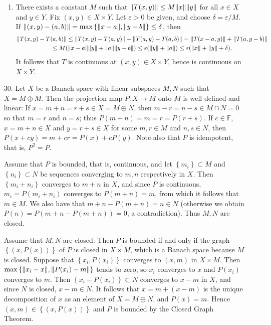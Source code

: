 \documentclass[11pt,leqno]{article}
\theoremstyle{plain}
\theoremstyle{definition}
\numberwithin{equation}{section}
\numberwithin{lem}{section}
\newcommand{\cbr}[1]{\left\{#1\right\}}
\begin{document}
\begin{enumerate}
\begin{enumerate}
    \item There exists a constant $M$ such that $\norm{T(x,y)}\leq M\norm{x}\norm{y}$ for all $x\in X$ and $y\in Y$. Fix $(x,y)\in X\times Y$. Let $\varepsilon>0$ be given, and choose $\delta = \varepsilon/M$. If $\norm{(x,y) - (a,b)} = \max\cbr{\norm{x-a},\norm{y-b}}\leq\delta$, then \begin{multline*}
      \norm{T(x,y) - T(a,b)} \leq \norm{T(x,y) - T(a,y)} + \norm{T(a,y) - T(a,b)} = \norm{T(x-a,y)} + \norm{T(a,y-b)}\\ \leq M(\norm{x-a}\norm{y} + \norm{a}\norm{y-b})\leq \varepsilon(\norm{y} + \norm{a})\leq \varepsilon(\norm{x} + \norm{y} + \delta).
    \end{multline*}
    It follows that $T$ is continuous at $(x,y)\in X\times Y$, hence is continuous on $X\times Y$.
  \end{enumerate}
  
  \item[30.] Let $X$ be a Banach space with linear subspaces $M,N$ such that $X = M\oplus M$. Then the projection map $P\colon X \to M$ onto $M$ is well defined and linear: If $x= m+n= r+s\in X = M\oplus N$, then $m-r = n-s \in M\cap N = 0$ so that $m = r$ and $n = s$; thus $P(m+n) = m = r = P(r+s)$. If $c\in\mathbb F$, $x = m+n\in X$ and $y = r+s\in X$ for some $m,r\in M$ and $n,s\in N$, then $P(x+cy)= m+cr = P(x) + cP(y)$. Note also that $P$ is idempotent, that is, $P^2 = P$.

  Assume that $P$ is bounded, that is, continuous, and let $\cbr{m_i}\subset M$ and $\cbr{n_i}\subset N$ be sequences converging to $m,n$ respectively in $X$. Then $\cbr{m_i + n_i}$ converges to $m+n$ in $X$, and since $P$ is continuous, $m_i = P(m_i+n_i)$ converges to $P(m+n) = m$, from which it follows that $m\in M$. We also have that $m+n-P(m+n) = n\in N$ (otherwise we obtain $P(n) = P(m+n-P(m+n)) = 0$, a contradiction). Thus $M,N$ are closed.

  Assume that $M,N$ are closed. Then $P$ is bounded if and only if the graph $\cbr{(x,P(x))}$ of $P$ is closed in $X\times M$, which is a Banach space because $M$ is closed. Suppose that $\cbr{x_i,P(x_i)}$ converges to $(x,m)$ in $X\times M$. Then $\max\cbr{\norm{x_i-x}, \norm{P(x_i)-m}}$ tends to zero, so $x_i$ converges to $x$ and $P(x_i)$ converges to $m$. Then $\cbr{x_i-P(x_i)}\subset N$ converges to $x-m$ in $X$, and since $N$ is closed, $x-m\in N$. It follows that $x = m + (x-m)$ is the unique decomposition of $x$ as an element of $X = M\oplus N$, and $P(x) = m$. Hence $(x,m)\in \cbr{(x,P(x))}$ and $P$ is bounded by the Closed Graph Theorem.
  

\end{enumerate}
\end{document}

